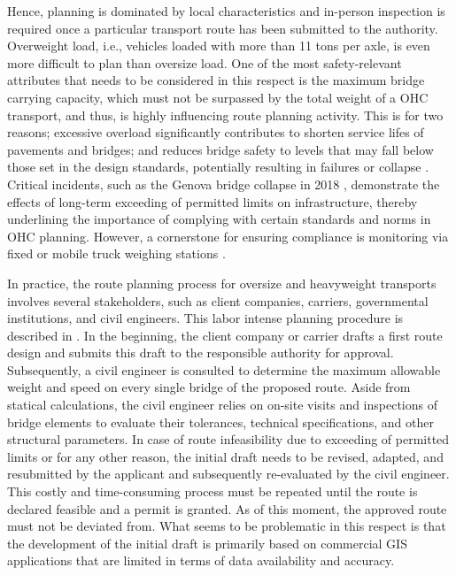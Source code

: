 Hence, planning is dominated by local characteristics and in-person inspection is required once a particular transport route has been submitted to the authority.
Overweight load, i.e., vehicles loaded with more than 11 tons per axle, is even more difficult to plan than oversize load.
One of the most safety-relevant attributes that needs to be considered in this respect is the maximum bridge carrying capacity, which must not be surpassed by the total weight of a OHC transport, and thus, is highly influencing route planning activity.
This is for two reasons; excessive overload significantly contributes to shorten service lifes of pavements and bridges; and reduces bridge safety to levels that may fall below those set in the design standards, potentially resulting in failures or collapse \cite{fiorillo2018fragility, yan2018optimal}.
Critical incidents, such as the Genova bridge collapse in 2018 \cite{Morgese.2020, MorandiNYTimes},  demonstrate the effects of long-term exceeding of permitted limits on infrastructure, thereby underlining the importance of complying with certain standards and norms in OHC planning. However, a cornerstone for ensuring compliance is monitoring via fixed or mobile truck weighing stations \cite{fiorillo2016minimizing}.
\par In practice, the route planning process for oversize and heavyweight transports involves several stakeholders, such as client companies, carriers, governmental institutions, and civil engineers.
This labor intense planning procedure is described in \cite{Osegueda.1999}. In the beginning, the client company or carrier drafts a first route design and submits this draft to the responsible authority for approval.
Subsequently, a civil engineer is consulted to determine the maximum allowable weight and speed on every single bridge of the proposed route.
Aside from statical calculations, the civil engineer relies on on-site visits and inspections of bridge elements to evaluate their tolerances, technical specifications, and other structural parameters.
In case of route infeasibility due to exceeding of permitted limits or for any other reason, the initial draft needs to be revised, adapted, and resubmitted by the applicant and subsequently re-evaluated by the civil engineer.
This costly and time-consuming process must be repeated until the route is declared feasible and a permit is granted. As of this moment, the approved route must not be deviated from.
What seems to be problematic in this respect is that the development of the initial draft is primarily based on commercial GIS applications that are limited in terms of data availability and accuracy.
